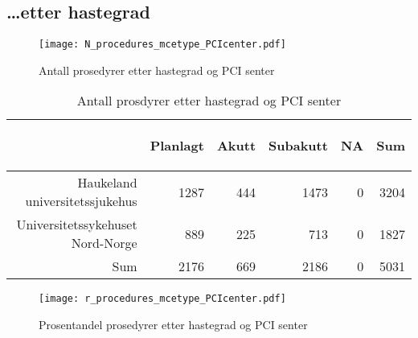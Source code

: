 \documentclass[norsk, a4paper]{report}
\begin{document}

\clearpage
\subsection{\ldots etter hastegrad}
  
\begin{figure}[ht]
  \centering
\texttt{[image: N\_procedures\_mcetype\_PCIcenter.pdf]}\caption{Antall prosedyrer etter hastegrad og PCI senter}
\end{figure}


\begin{table}[ht]
\centering
\begin{tabular}{rrrrrr}
  \toprule
 & \begin{sideways} Planlagt \end{sideways} & \begin{sideways} Akutt \end{sideways} & \begin{sideways} Subakutt \end{sideways} & \begin{sideways} NA \end{sideways} & \begin{sideways} Sum \end{sideways} \\ 
  \midrule
Haukeland universitetssjukehus & 1287 & 444 & 1473 & 0 & 3204 \\ 
  Universitetssykehuset Nord-Norge & 889 & 225 & 713 & 0 & 1827 \\ 
  Sum & 2176 & 669 & 2186 & 0 & 5031 \\ 
   \bottomrule
\end{tabular}
\caption{Antall prosdyrer etter hastegrad og PCI senter} 
\end{table}

\clearpage
\begin{figure}[ht]
  \centering
\texttt{[image: r\_procedures\_mcetype\_PCIcenter.pdf]}\caption{Prosentandel prosedyrer etter hastegrad og PCI senter}
\end{figure}
\end{document}
